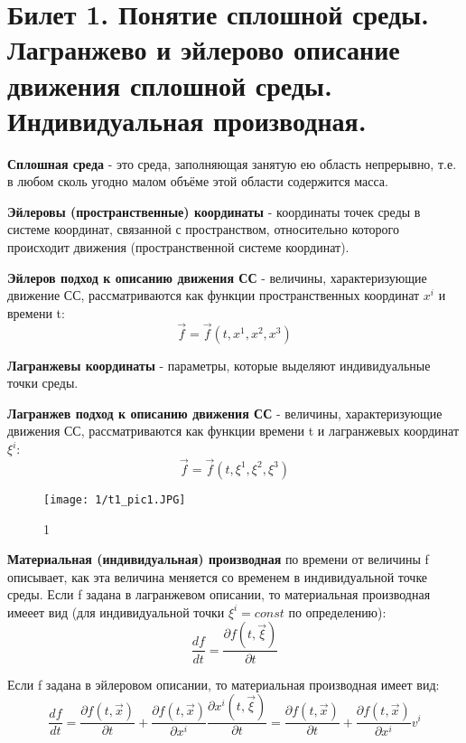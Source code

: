 \newpage
\section{Билет 1. Понятие сплошной среды. Лагранжево и эйлерово описание движения сплошной среды. Индивидуальная производная.}

\textbf{Сплошная среда} - это среда, заполняющая занятую ею область непрерывно, т.е. в любом сколь угодно малом объёме этой области содержится масса.

\textbf{Эйлеровы (пространственные) координаты} - координаты точек среды в системе координат, связанной с пространством, относительно которого происходит движения (пространственной системе координат).

\textbf{Эйлеров подход к описанию движения СС} - величины, характеризующие движение СС, рассматриваются как функции пространственных координат $x^i$ и времени t: $$\vec{f} = \vec{f}(t, x^1, x^2, x^3)$$

\textbf{Лагранжевы координаты} - параметры, которые выделяют индивидуальные точки среды.

\textbf{Лагранжев подход к описанию движения СС} - величины, характеризующие движения СС, рассматриваются как функции времени t и лагранжевых координат $\xi^i$: $$\vec{f} = \vec{f}(t, \xi^1, \xi^2, \xi^3)$$
\begin{figure}{}
\texttt{[image: 1/t1\_pic1.JPG]}
\caption{\label{ris:image1_2}1}
\end{figure}

\textbf{Материальная (индивидуальная) производная} по времени от величины f описывает, как эта величина меняется со временем в индивидуальной точке среды. Если f задана в лагранжевом описании, то материальная производная имееет вид (для индивидуальной точки $\xi^i = const $ по определению): $$\frac{df}{dt} = \frac{\partial f(t,\vec{\xi})}{\partial t}$$

Если f задана в эйлеровом описании, то материальная производная имеет вид: $$\frac{df}{dt} = \frac{\partial f(t,\vec{x})}{\partial t} + \frac{\partial f(t, \vec{x})}{\partial x^i}\frac{\partial x^i(t,\vec{\xi})}{\partial t} = \frac{\partial f(t,\vec{x})}{\partial t} + \frac{\partial f(t, \vec{x})}{\partial x^i}v^i$$
